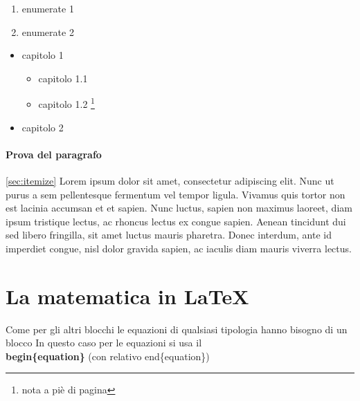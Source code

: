 \documentclass[]{article}
\begin{document}
    \begin{enumerate}
        \item enumerate 1
        \item enumerate 2
    \end{enumerate}

    \begin{itemize}
        \item capitolo 1
        \begin{itemize}
            \item capitolo 1.1
            \item capitolo 1.2 \footnote{nota a piè di pagina}
        \end{itemize}
        \item capitolo 2
    \end{itemize}

    \paragraph[Enunciato]{Prova del paragrafo} 
    \ref{sec:itemize} %
    Lorem ipsum dolor sit amet, consectetur adipiscing elit. Nunc ut purus a sem pellentesque fermentum vel tempor ligula. Vivamus quis tortor non est lacinia accumsan et et sapien. Nunc luctus, sapien non maximus laoreet, diam ipsum tristique lectus, ac rhoncus lectus ex congue sapien. Aenean tincidunt dui sed libero fringilla, sit amet luctus mauris pharetra. Donec interdum, ante id imperdiet congue, nisl dolor gravida sapien, ac iaculis diam mauris viverra lectus.

    \section{La matematica in LaTeX}
    Come per gli altri blocchi le equazioni di qualsiasi tipologia hanno bisogno di un blocco
    In questo caso per le equazioni si usa il  \textbf{\\begin\{equation\}} (con relativo end\{equation\})
\end{document}
